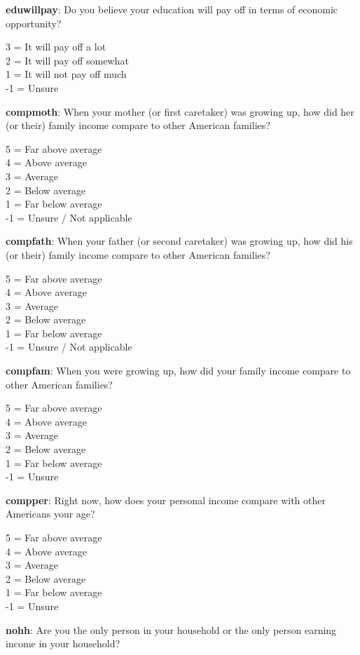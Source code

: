 \documentclass[11pt, headsepline]{article}
\begin{document}
\textbf{eduwillpay}: Do you believe your education will pay off in terms of economic opportunity?

3 = It will pay off a lot \\
2 = It will pay off somewhat \\
1 = It will not pay off much \\
-1 = Unsure 

\textbf{compmoth}: When your mother (or first caretaker) was growing up, how did her (or their) family income compare to other American families?

5 = Far above average \\ 
4 = Above average \\ 
3 = Average \\
2 = Below average \\
1 = Far below average \\
-1 = Unsure / Not applicable

\textbf{compfath}: When your father (or second caretaker) was growing up, how did his (or their) family income compare to other American families?

5 = Far above average \\ 
4 = Above average \\ 
3 = Average \\
2 = Below average \\
1 = Far below average \\
-1 = Unsure / Not applicable

\textbf{compfam}: When you were growing up, how did your family income compare to other American families?

5 = Far above average \\ 
4 = Above average \\ 
3 = Average \\
2 = Below average \\
1 = Far below average \\
-1 = Unsure

\textbf{compper}: Right now, how does your personal income compare with other Americans your age?

5 = Far above average \\ 
4 = Above average \\ 
3 = Average \\
2 = Below average \\
1 = Far below average \\
-1 = Unsure

\textbf{nohh}: Are you the only person in your household or the only person earning income in your household?
\end{document}
